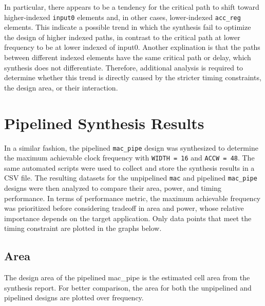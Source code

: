 \documentclass[a4paper,11pt]{article}
\begin{document}
In particular, there appears to be a tendency for the critical path to shift toward higher-indexed \texttt{input0} elements and, in other cases, lower-indexed \texttt{acc\_reg} elements. This indicate a possible trend in which the synthesis fail to optimize the design of higher indexed paths, in contrast to the critical path at lower frequency to be at lower indexed of input0. Another explination is that the paths between different indexed elements have the same critical path or delay, which synthesis does not differentiate. Therefore, additional analysis is required to determine whether this trend is directly caused by the stricter timing constraints, the design area, or their interaction. 


\section{Pipelined Synthesis Results}

In a similar fashion, the pipelined \texttt{mac\_pipe} design was synthesized to determine the maximum achievable clock frequency with \texttt{WIDTH = 16} and \texttt{ACCW = 48}. The same automated scripts were used to collect and store the synthesis results in a CSV file. The resulting datasets for the unpipelined \texttt{mac} and pipelined \texttt{mac\_pipe} designs were then analyzed to compare their area, power, and timing performance. In terms of performance metric, the maximum achievable frequency was prioritized before considering tradeoff in area and power, whose relative importance depends on the target application. Only data points
that meet the timing constraint are plotted in the graphs below.




\subsection{Area}

The design area of the pipelined mac\_pipe is the estimated cell area from the synthesis report. For better comparison, the area for both the unpipelined and pipelined designs are plotted over frequency. 
\end{document}

